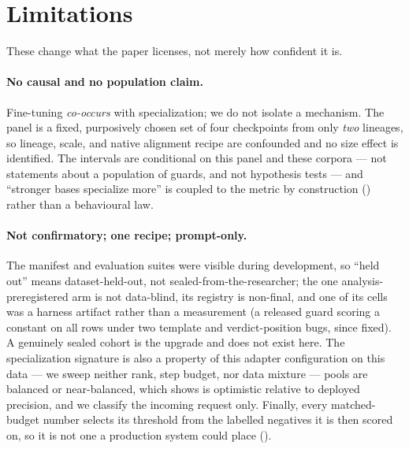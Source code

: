 \documentclass[manuscript,screen,review,anonymous]{acmart}
\begin{document}
\section{Limitations}
\label{sec:limitations}

These change what the paper licenses, not merely how confident it is.

\paragraph{No causal and no population claim.} Fine-tuning \emph{co-occurs} with specialization; we do
not isolate a mechanism. The panel is a fixed, purposively chosen set of four checkpoints from only
\emph{two} lineages, so lineage, scale, and native alignment recipe are confounded and no size effect is
identified. The intervals are conditional on this panel and these corpora --- not statements about a
population of guards, and not hypothesis tests --- and ``stronger bases specialize more'' is coupled to
the metric by construction () rather than a behavioural law.

\paragraph{Not confirmatory; one recipe; prompt-only.} The manifest and evaluation suites were visible
during development, so ``held out'' means dataset-held-out, not sealed-from-the-researcher; the one
analysis-preregistered arm is not data-blind, its registry is non-final, and one of its cells was a
harness artifact rather than a measurement (a released guard scoring a constant on all rows under two
template and verdict-position bugs, since fixed). A genuinely sealed cohort is the upgrade and does not
exist here. The specialization signature is also a property of this adapter configuration on this data
--- we sweep neither rank, step budget, nor data mixture --- pools are balanced or near-balanced, which
 shows is optimistic relative to deployed precision, and we classify the incoming
request only. Finally, every matched-budget number selects its threshold from the labelled
negatives it is then scored on, so it is not one a production system could place
().
\end{document}
